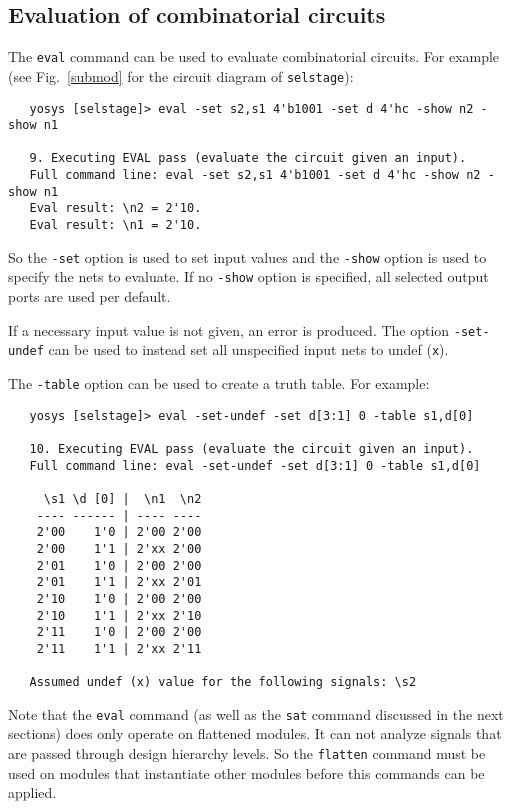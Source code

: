 \documentclass[9pt,technote,a4paper]{IEEEtran}
\begin{document}
\subsection{Evaluation of combinatorial circuits}

The {\tt eval} command can be used to evaluate combinatorial circuits.
For example (see Fig.~\ref{submod} for the circuit diagram of {\tt selstage}):

{\scriptsize
\begin{verbatim}
   yosys [selstage]> eval -set s2,s1 4'b1001 -set d 4'hc -show n2 -show n1

   9. Executing EVAL pass (evaluate the circuit given an input).
   Full command line: eval -set s2,s1 4'b1001 -set d 4'hc -show n2 -show n1
   Eval result: \n2 = 2'10.
   Eval result: \n1 = 2'10.
\end{verbatim}
\par}

So the {\tt -set} option is used to set input values and the {\tt -show} option
is used to specify the nets to evaluate. If no {\tt -show} option is specified,
all selected output ports are used per default.

If a necessary input value is not given, an error is produced. The option
{\tt -set-undef} can be used to instead set all unspecified input nets to
undef ({\tt x}).

The {\tt -table} option can be used to create a truth table. For example:

{\scriptsize
\begin{verbatim}
   yosys [selstage]> eval -set-undef -set d[3:1] 0 -table s1,d[0]

   10. Executing EVAL pass (evaluate the circuit given an input).
   Full command line: eval -set-undef -set d[3:1] 0 -table s1,d[0]

     \s1 \d [0] |  \n1  \n2
    ---- ------ | ---- ----
    2'00    1'0 | 2'00 2'00
    2'00    1'1 | 2'xx 2'00
    2'01    1'0 | 2'00 2'00
    2'01    1'1 | 2'xx 2'01
    2'10    1'0 | 2'00 2'00
    2'10    1'1 | 2'xx 2'10
    2'11    1'0 | 2'00 2'00
    2'11    1'1 | 2'xx 2'11

   Assumed undef (x) value for the following signals: \s2
\end{verbatim}
}

Note that the {\tt eval} command (as well as the {\tt sat} command discussed in
the next sections) does only operate on flattened modules. It can not analyze
signals that are passed through design hierarchy levels. So the {\tt flatten}
command must be used on modules that instantiate other modules before this
commands can be applied.
\end{document}
